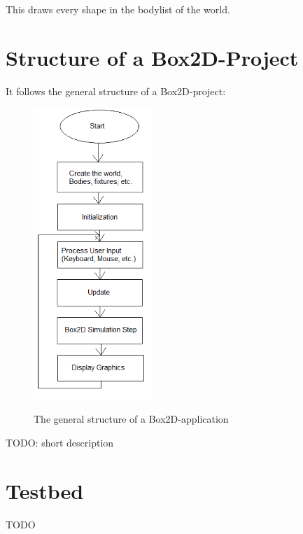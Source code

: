 \documentclass[10pt,a4paper,DIV=11]{scrreprt}
\begin{document}
This draws every shape in the bodylist of the world.
 \newpage
\section{Structure of a Box2D-Project}
It follows the general structure of a Box2D-project: \\

\begin{center}
	\begin{figure}[H]
		\centering
		\includegraphics[width=0.4\textwidth,scale=0.5]{files/Box2D-Structure.png}
		\caption{The general structure of a Box2D-application} \cite{box2d-structure}
		\label{fig:box2d-structure}
	\end{figure}
\end{center}

TODO: short description



\section{Testbed}

TODO

\end{document}
